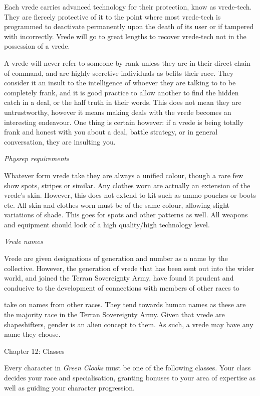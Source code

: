 \documentclass{scrbook}
\begin{document}
Each vrede carries advanced technology for their protection, know as vrede-tech. They are fiercely protective of it to the point where most vrede-tech is programmed to deactivate permanently upon the death of its user or if tampered with incorrectly. Vrede will go to great lengths to recover vrede-tech not in the possession of a vrede.

A vrede will never refer to someone by rank unless they are in their direct chain of command, and are highly secretive individuals as befits their race. They consider it an insult to the intelligence of whoever they are talking to to be completely frank, and it is good practice to allow another to find the hidden catch in a deal, or the half truth in their words. This does not mean they are untrustworthy, however it means making deals with the vrede becomes an interesting endeavour. One thing is certain however: if a vrede is being totally frank and honest with you about a deal, battle strategy, or in general conversation, they are insulting you.

\textit{Physrep requirements}

Whatever form vrede take they are always a unified colour, though a rare few show spots, stripes or similar. Any clothes worn are actually an extension of the vrede's skin. However, this does not extend to kit such as ammo pouches or boots etc. All skin and clothes worn must be of the same colour, allowing slight variations of shade. This goes for spots and other patterns as well. All weapons and equipment should look of a high quality/high technology level.

\textit{Vrede names}

Vrede are given designations of generation and number as a name by the collective. However, the generation of vrede that has been sent out into the wider world, and joined the Terran Sovereignty Army, have found it prudent and conducive to the development of connections with members of other races to

take on names from other races. They tend towards human names as these are the majority race in the Terran Sovereignty Army. Given that vrede are shapeshifters, gender is an alien concept to them. As such, a vrede may have any name they choose.

Chapter 12: Classes

Every character in \textit{Green Cloaks} must be one of the following classes. Your class decides your race and specialisation, granting bonuses to your area of expertise as well as guiding your character progression.
\end{document}
